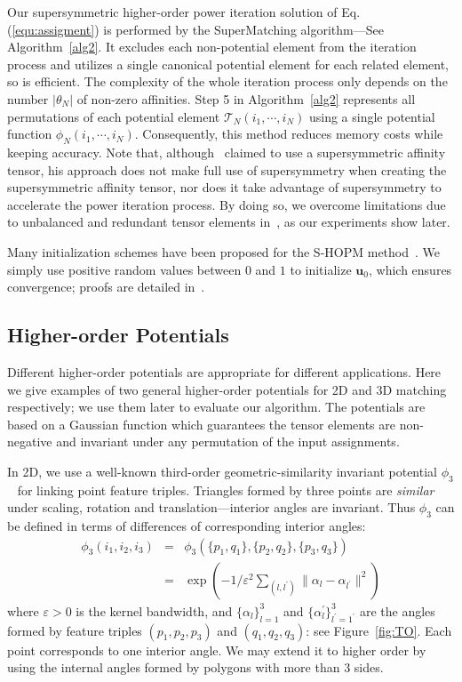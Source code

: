 Our supersymmetric higher-order power iteration solution of Eq. (\ref{equ:assigment}) is performed by the SuperMatching algorithm---See Algorithm~\ref{alg2}.
It excludes each non-potential element from the iteration process and utilizes a single canonical potential element for each related element, so is efficient.
The complexity of the whole iteration process only depends on the number $|\theta_N|$ of non-zero affinities. Step 5 in Algorithm~\ref{alg2} represents all permutations of each potential element $\mathcal{T}_N(i_1,\cdots,i_N)$
using a single potential function $\phi_N(i_1,\cdots,i_N)$.
Consequently, this method reduces memory costs while keeping accuracy.
Note that, although~\cite{Duchenne09} claimed to use a supersymmetric affinity tensor,
his approach does not make full use of supersymmetry when creating the supersymmetric affinity tensor,
nor does it take advantage of supersymmetry to accelerate the power iteration process.
By doing so, we overcome limitations due to unbalanced and redundant tensor elements in~\cite{Duchenne09}, as our experiments show later.

Many initialization schemes have been proposed for the S-HOPM method~\cite{Kofidis02}.
We simply use positive random values between $0$ and $1$ to initialize $\boldsymbol{u}_0$, which ensures convergence; proofs are detailed in~\cite{Regalia00,Kofidis02}.

\subsection{Higher-order Potentials}
\label{subsec:potentials}

Different higher-order potentials are appropriate for different applications.
Here we give examples of two general higher-order potentials for  2D and 3D matching respectively; we  use them later to evaluate our algorithm.
The potentials are based on a Gaussian function
which guarantees the tensor elements are non-negative and invariant under any permutation of the input assignments.

In 2D, we use a well-known third-order geometric-similarity invariant potential $\phi_3$~\cite{Duchenne09,Chertok10} for linking point feature triples.
Triangles formed by three points are \emph{similar} under scaling, rotation and translation---interior angles are invariant.
Thus $\phi_3$ can be defined in terms of differences of corresponding interior angles:
\begin{eqnarray}
\phi_3(i_1,i_2,i_3)&=&\phi_3(\{p_1,q_1\}, \{p_2,q_2\}, \{p_3,q_3\})\nonumber\\
&=&\exp(-1/\varepsilon^2\sum\nolimits_{(l,l^{'})}\lVert \alpha_l- \alpha_{l^{'} } \lVert^2 )
\end{eqnarray}
where $\varepsilon > 0$ is the kernel bandwidth,
and $\{\alpha_l\}_{l=1}^3$ and $\{\alpha_l^{'}\}_{l^{'}=1^{'}}^{3}$ are the angles formed by feature triples $(p_1,p_2,p_3)$ and $(q_1,q_2,q_3)$:
see Figure~\ref{fig:TO}. Each point corresponds to one interior angle.
We may extend it to higher order by using the internal angles formed by polygons with more than 3 sides.

